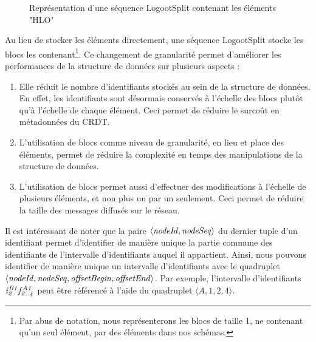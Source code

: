 \begin{figure}[!ht]
  \centering
  \hfil
  \caption{Représentation d'une séquence LogootSplit contenant les éléments "HLO"}
  \label{fig:logootsplit-seq}
\end{figure}

Au lieu de stocker les éléments directement, une séquence LogootSplit stocke les blocs les contenant\footnote{Par abus de notation, nous représenterons les blocs de taille 1, \ie ne contenant qu'un seul élément, par des éléments dans nos schémas.}.
Ce changement de granularité permet d'améliorer les performances de la structure de données sur plusieurs aspects :
\begin{enumerate}
  \item Elle réduit le nombre d'identifiants stockés au sein de la structure de données.
    En effet, les identifiants sont désormais conservés à l'échelle des blocs plutôt qu'à l'échelle de chaque élément.
    Ceci permet de réduire le surcoût en métadonnées du \ac{CRDT}.
  \item L'utilisation de blocs comme niveau de granularité, en lieu et place des éléments, permet de réduire la complexité en temps des manipulations de la structure de données.
  \item L'utilisation de blocs permet aussi d'effectuer des modifications à l'échelle de plusieurs éléments, et non plus un par un seulement.
    Ceci permet de réduire la taille des messages diffusés sur le réseau.
\end{enumerate}

Il est intéressant de noter que la paire $\langle \mathit{nodeId},\mathit{nodeSeq} \rangle$ du dernier tuple d'un identifiant permet d'identifier de manière unique la partie commune des identifiants de l'intervalle d'identifiants auquel il appartient.
Ainsi, nous pouvons identifier de manière unique un intervalle d'identifiants avec le quadruplet $\langle \mathit{nodeId}, \mathit{nodeSeq}, \mathit{offsetBegin}, \mathit{offsetEnd} \rangle$.
Par exemple, l'intervalle d'identifiants $\mathit{i}^{\mathit{B1}}_{\mathit{2}}\mathit{f}^{\mathit{A1}}_{\mathit{2..4}}$ peut être référencé à l'aide du quadruplet $\langle A,1,2,4 \rangle$.
